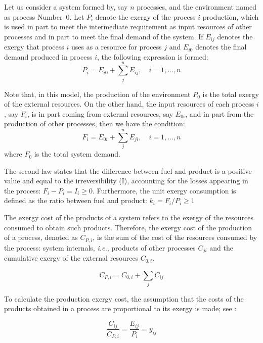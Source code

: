 \documentclass[sustainability,article,accept,moreauthors,pdftex,12pt,a4paper]{mdpi}
\begin{document}
Let us consider a system formed by, say $n$ processes, and the environment named as process Number~0. Let $P_i$ denote the exergy of the process $i$ production, which is used in part to meet the intermediate requirement as input resources of other processes and in part to meet the final demand of the system. If $E_{ij}$ denotes the exergy that process $i$ uses as a resource for process $j$ and $E_{i0}$ denotes the final demand produced in process $i$, the following expression is formed:
\begin{equation}
\label{eq:F}
P_i=E_{i0}+\sum_{j}^{n}E_{ij}, \quad i=1,\ldots,n
\end{equation}

Note that, in this model, the production of the environment $P_0$ is the total exergy of the external resources. On the other hand, the input resources of each process $i$, say $F_i$, is in
part coming from external resources, say $E_{0i}$, and in part from the
production of other processes, then we have the condition:
\begin{equation}
\label{eq:P}
F_i=E_{0i}+\sum_{j}^{n}E_{ji}, \quad i=1,\ldots,n
\end{equation}
\noindent where $F_0$ is the total system demand.


The second law states that the difference between fuel and product is a positive 
value and equal to the irreversibility (I), accounting for the losses 
appearing in the process: $F_i - P_i = I_i \geq 0$. Furthermore, the unit 
exergy consumption is defined as the ratio between fuel and product: 
$k_i={F_i}/{P_i} \geq 1$

The exergy cost of the products of a system refers to the exergy of the resources consumed to obtain such products. Therefore, the exergy cost of the production of a process, denoted as $C_{P,i}$, is the sum of the cost of the resources consumed by the process: system internals, \textit{i.e.}, products of other processes $C_{ji}$ and the cumulative exergy of the external resources $C_{0,i}$.

\begin{equation}
 C_{P,i}=C_{0,i}+\sum_{j}C_{ij}
 \label{eq1}
\end{equation}

To calculate the production exergy cost, the assumption that the costs of the products obtained in a process are proportional to its exergy is made; see \cite{Lozano1993}:

\begin{equation}
\frac{C_{ij}}{C_{P,i}}=\frac{E_{ij}}{P_i}=y_{ij}
\label{eq2}
\end{equation}
\end{document}
